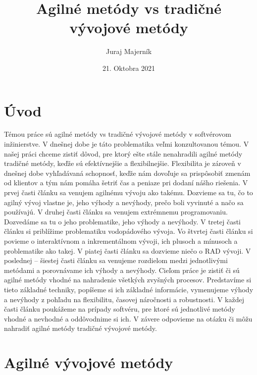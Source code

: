 \documentclass{article}
\begin{document}
\title{Agilné metódy vs tradičné vývojové metódy}
\author{Juraj Majerník}
\date{21. Oktobra 2021}
\maketitle
\begin{abstract}
\end{abstract}
\section{Úvod}
Témou práce sú agilné metódy vs tradičné vývojové metódy v softvérovom inžinierstve. V dnešnej dobe je táto problematika veľmi konzultovanou témou. 
V našej práci chceme zistiť dôvod, pre ktorý ešte stále nenahradili agilné metódy tradičné metódy, keďže sú efektívnejšie a flexibilnejšie. Flexibilita je zároveň v dnešnej dobe vyhľadávaná schopnosť, keďže nám dovoľuje sa prispôsobiť zmenám od klientov a tým nám pomáha šetriť čas a peniaze pri dodaní nášho riešenia. 
V prvej časti článku sa venujem agilnému vývoju ako takému. Dozvieme sa tu, čo to agilný vývoj vlastne je, jeho výhody a nevýhody, prečo boli vyvinuté a načo sa používajú. 
V druhej časti článku sa venujem extrémnemu programovaniu. Dozvedáme sa tu o jeho problematike, jeho výhody a nevýhody. 
V tretej časti článku si priblížime problematiku vodopádového vývoja. 
Vo štvrtej časti článku si povieme o interaktívnom a inkrementálnom vývoji, ich plusoch a mínusoch a problematike ako takej. 
V piatej časti článku sa dozvieme niečo o RAD vývoji. 
V poslednej – šiestej časti článku sa venujeme rozdielom medzi jednotlivými metódami a porovnávame ich výhody a nevýhody. 
Cieľom práce je zistiť či sú agilné metódy vhodné na nahradenie všetkých zvyšných procesov. Predstavíme si tieto základné techniky, popíšeme si ich základné informácie, vymenujeme výhody a nevýhody z pohľadu na flexibilitu, časovej náročnosti a robustnosti. V každej časti článku poukážeme na prípady softvéru, pre ktoré sú jednotlivé metódy vhodné a nevhodné a oddôvodnime si ich. V závere odpovieme na otázku či môžu nahradiť agilné metódy tradičné vývojové metódy.

\section{Agilné vývojové metódy}
\end{document}

